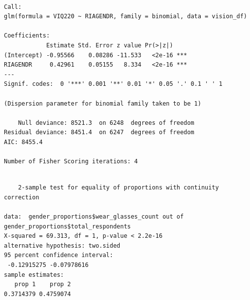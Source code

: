 \documentclass[
  12pt,
]{article}
\newenvironment{Shaded}{\begin{snugshade}}{\end{snugshade}}
\newcommand{\AttributeTok}[1]{\textcolor[rgb]{0.40,0.45,0.13}{#1}}
\newcommand{\CommentTok}[1]{\textcolor[rgb]{0.37,0.37,0.37}{#1}}
\newcommand{\ConstantTok}[1]{\textcolor[rgb]{0.56,0.35,0.01}{#1}}
\newcommand{\DecValTok}[1]{\textcolor[rgb]{0.68,0.00,0.00}{#1}}
\newcommand{\FunctionTok}[1]{\textcolor[rgb]{0.28,0.35,0.67}{#1}}
\newcommand{\NormalTok}[1]{\textcolor[rgb]{0.00,0.23,0.31}{#1}}
\newcommand{\OtherTok}[1]{\textcolor[rgb]{0.00,0.23,0.31}{#1}}
\newcommand{\SpecialCharTok}[1]{\textcolor[rgb]{0.37,0.37,0.37}{#1}}
\begin{document}
\begin{verbatim}

Call:
glm(formula = VIQ220 ~ RIAGENDR, family = binomial, data = vision_df)

Coefficients:
            Estimate Std. Error z value Pr(>|z|)    
(Intercept) -0.95566    0.08286 -11.533   <2e-16 ***
RIAGENDR     0.42961    0.05155   8.334   <2e-16 ***
---
Signif. codes:  0 '***' 0.001 '**' 0.01 '*' 0.05 '.' 0.1 ' ' 1

(Dispersion parameter for binomial family taken to be 1)

    Null deviance: 8521.3  on 6248  degrees of freedom
Residual deviance: 8451.4  on 6247  degrees of freedom
AIC: 8455.4

Number of Fisher Scoring iterations: 4
\end{verbatim}

\begin{Shaded}
\end{Shaded}

\begin{verbatim}

    2-sample test for equality of proportions with continuity correction

data:  gender_proportions$wear_glasses_count out of gender_proportions$total_respondents
X-squared = 69.313, df = 1, p-value < 2.2e-16
alternative hypothesis: two.sided
95 percent confidence interval:
 -0.12915275 -0.07978616
sample estimates:
   prop 1    prop 2 
0.3714379 0.4759074 
\end{verbatim}
\end{document}
